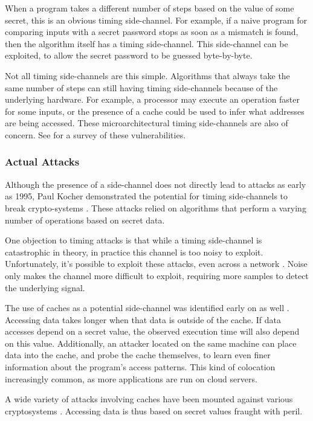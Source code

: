 \documentclass[11pt, a4paper]{article} %
\begin{document}
{When a program takes a different number of steps based on the value of some
secret, this is an obvious timing side-channel.
For example, if a naive program for comparing inputs with a secret password
stops as soon as a mismatch is found, then the algorithm itself has
a timing side-channel. This side-channel can be exploited, to allow
the secret password to be guessed byte-by-byte.

Not all timing side-channels are this simple. Algorithms
that always take the same number of steps
can still having timing side-channels because of the underlying
hardware. For example, a processor may
execute an operation faster for some inputs, or the presence of a cache
could be used to infer what addresses are being accessed. These
microarchitectural timing side-channels are also of concern.
See \cite{ge_survey_2018} for a survey of these vulnerabilities.

\subsubsection{Actual Attacks}

Although the presence of a side-channel
does not directly lead to attacks
as early as 1995, Paul Kocher
demonstrated the potential for timing side-channels to break
crypto-systems
\cite{kocher_cryptanalysis_1995, kocher_timing_1996}.
These attacks relied on algorithms that perform a varying number of
operations based on secret data. 

One objection to timing attacks is that
while a timing side-channel is catastrophic in theory, in practice
this channel is too noisy to exploit. Unfortunately,
it's possible to exploit these attacks, even across
a network \cite{brumley_remote_2005, brumley_remote_2011}.
Noise only makes the channel more difficult to exploit,
requiring more samples to detect the underlying signal.

The use of caches as a potential side-channel was
identified early on as well \cite{page_theoretical_2002}.
Accessing data takes longer when that data is outside
of the cache.
If data accesses depend on a secret value, the observed execution
time will also depend on this value. Additionally,
an attacker located on the same machine
can place data into the cache, and probe
the cache themselves, to learn even finer information about the
program's access patterns. This kind of colocation increasingly common,
as more applications are run on cloud servers.

A wide variety of attacks involving caches have been mounted
against various cryptosystems
\cite{
  bernstein_cache-timing_2005,
  yarom_cachebleed_2017,
  cabrera_aldaya_cache-timing_2019}
. Accessing data is thus based on secret
values fraught with peril.

}
\end{document}
